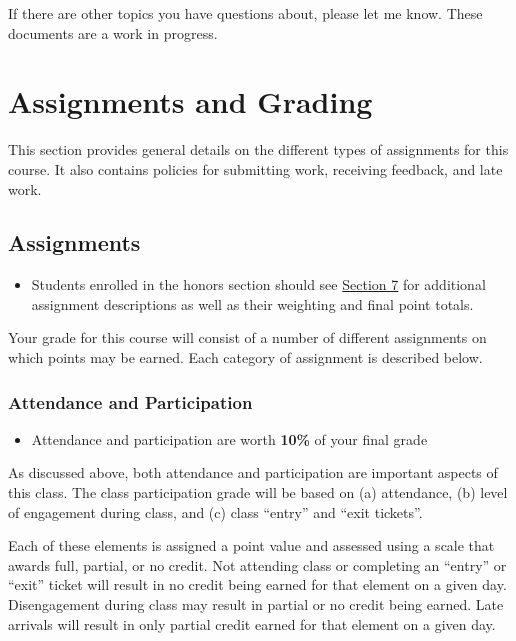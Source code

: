 \documentclass[]{book}
\newenvironment{rmdblock}[1]
  {\begin{shaded*}
  \begin{itemize}
  \renewcommand{\labelitemi}{
    \raisebox{-.7\height}[0pt][0pt]{
      {\setkeys{Gin}{width=3em,keepaspectratio}\texttt{[image: images/\#1]}}
    }
  }
  \item
  }
  {
  \end{itemize}
  \end{shaded*}
  }
\newenvironment{rmdtip}
  {\begin{rmdblock}{tip}}
  {\end{rmdblock}}
\newenvironment{rmdwarning}
  {\begin{rmdblock}{warning}}
  {\end{rmdblock}}
\begin{document}
If there are other topics you have questions about, please let me know. These documents are a work in progress.

\hypertarget{assignments-and-grading}{%
\chapter{Assignments and Grading}\label{assignments-and-grading}}

This section provides general details on the different types of assignments for this course. It also contains policies for submitting work, receiving feedback, and late work.

\hypertarget{assignments}{%
\section{Assignments}\label{assignments}}

\begin{rmdwarning}
Students enrolled in the honors section should see
\href{/honors-overview.html}{Section 7} for additional assignment
descriptions as well as their weighting and final point totals.
\end{rmdwarning}

Your grade for this course will consist of a number of different assignments on which points may be earned. Each category of assignment is described below.

\hypertarget{attendance-and-participation-1}{%
\subsection{Attendance and Participation}\label{attendance-and-participation-1}}

\begin{rmdtip}
Attendance and participation are worth \textbf{10\%} of your final grade
\end{rmdtip}

As discussed above, both attendance and participation are important aspects of this class. The class participation grade will be based on (a) attendance, (b) level of engagement during class, and (c) class ``entry'' and ``exit tickets''.

Each of these elements is assigned a point value and assessed using a scale that awards full, partial, or no credit. Not attending class or completing an ``entry'' or ``exit'' ticket will result in no credit being earned for that element on a given day. Disengagement during class may result in partial or no credit being earned. Late arrivals will result in only partial credit earned for that element on a given day.
\end{document}
